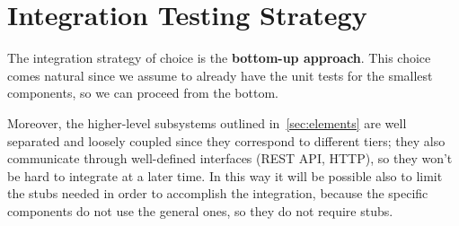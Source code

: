 \section{Integration Testing Strategy}
\label{sec:integration-testing-strategy}

The integration strategy of choice is the \textbf{bottom-up approach}.
This choice comes natural since we assume to already have the unit tests for the smallest components, so we can proceed from the bottom.

Moreover, the higher-level subsystems outlined in~\autoref{sec:elements} are well separated and loosely coupled since they correspond to different tiers;
they also communicate through well-defined interfaces (REST API, HTTP), so they won't be hard to integrate at a later time.
In this way it will be possible also to limit the stubs needed in order to accomplish the integration, because the specific components do not use the general ones,  so they do not require stubs.

